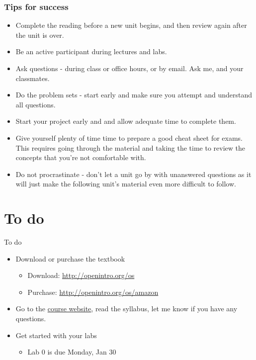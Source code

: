 \documentclass[11pt]{beamer}
\begin{document}
\begin{frame}
\frametitle{Tips for success}

{\footnotesize
\begin{itemize}[<alert@+>]
\item Complete the reading before a new unit begins, and then review again after the 
unit is over.
\item Be an active participant during lectures and labs.
\item Ask questions - during class or office hours, or by email. Ask me, and 
your classmates.
\item Do the problem sets - start early and make sure you attempt and understand all 
questions.

\item Start your project early and and allow adequate time to complete them.
\item Give yourself plenty of time time to prepare a good cheat sheet for exams. This 
requires going through the material and taking the time to review the concepts that 
you're not comfortable with.
\item Do not procrastinate - don't let a unit go by with unanswered questions as it 
will just make the following unit's material even more difficult to follow. 
\end{itemize}
}

\end{frame}



\section{To do}


\begin{frame}{To do}

\begin{itemize}

\item Download or purchase the textbook
\begin{itemize}
\item Download: \url{http://openintro.org/os}
\item Purchase: \url{http://openintro.org/os/amazon}
\end{itemize}

\item Go to the \alert{\href{https://garciarios.github.io/govt_3990/}{course website}}, read the syllabus, let me know if you have any questions.

\item Get started with your labs
\begin{itemize}
\item Lab 0 is due Monday, Jan 30
\end{itemize}

\end{itemize}

\end{frame}
\end{document}
